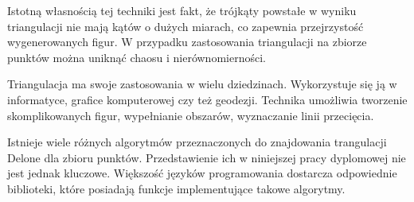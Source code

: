 Istotną własnością tej techniki jest fakt, że trójkąty powstałe w wyniku triangulacji nie mają kątów o dużych miarach, co zapewnia przejrzystość wygenerowanych figur. W przypadku zastosowania triangulacji na zbiorze punktów można uniknąć chaosu i nierównomierności.

Triangulacja ma swoje zastosowania w wielu dziedzinach. Wykorzystuje się ją w informatyce, grafice komputerowej czy też geodezji. Technika umożliwia tworzenie skomplikowanych figur, wypełnianie obszarów, wyznaczanie linii przecięcia.

Istnieje wiele różnych algorytmów przeznaczonych do znajdowania trangulacji Delone dla zbioru punktów. Przedstawienie ich w niniejszej pracy dyplomowej nie jest jednak kluczowe. Większość języków programowania dostarcza odpowiednie biblioteki, które posiadają funkcje implementujące takowe algorytmy. 





